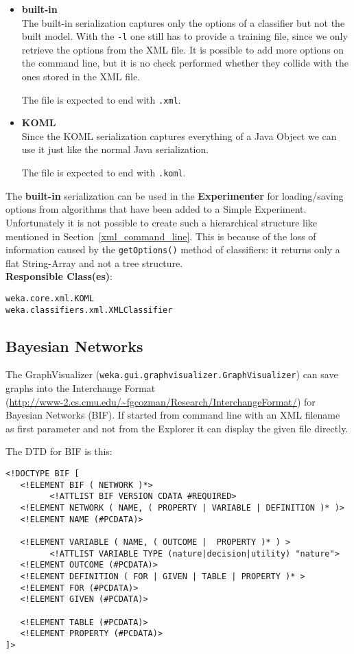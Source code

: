 \begin{itemize}
\item \textbf{built-in}\\
The built-in serialization captures only the options of a classifier
but not the built model. With the \verb=-l= one still has to provide a
training file, since we only retrieve the options from the XML
file. It is possible to add more options on the command line, but it
is no check performed whether they collide with the ones stored in the
XML file.

The file is expected to end with \verb=.xml=.

\item \textbf{KOML}\\
Since the KOML serialization captures everything of a Java Object we
can use it just like the normal Java serialization.

The file is expected to end with \verb=.koml=.
\end{itemize}

\noindent The \textbf{built-in} serialization can be used in the
\textbf{Experimenter} for loading/saving options from algorithms that
have been added to a Simple Experiment. Unfortunately it is not
possible to create such a hierarchical structure like mentioned in
Section~\ref{xml_command_line}. This is because of the loss of
information caused by the \verb=getOptions()= method of classifiers: it
returns only a flat String-Array and not a tree structure.\\

\noindent \textbf{Responsible Class(es)}:

\begin{verbatim}
weka.core.xml.KOML
weka.classifiers.xml.XMLClassifier
\end{verbatim}

\subsection{Bayesian Networks}
The GraphVisualizer (\verb=weka.gui.graphvisualizer.GraphVisualizer=) can
save graphs into the Interchange Format\\
(\url{http://www-2.cs.cmu.edu/~fgcozman/Research/InterchangeFormat/}{}) for
Bayesian Networks (BIF). If started from command line with an XML
filename as first parameter and not from the Explorer it can display
the given file directly.

The DTD for BIF is this:

\begin{verbatim}
<!DOCTYPE BIF [
   <!ELEMENT BIF ( NETWORK )*>
         <!ATTLIST BIF VERSION CDATA #REQUIRED>
   <!ELEMENT NETWORK ( NAME, ( PROPERTY | VARIABLE | DEFINITION )* )>
   <!ELEMENT NAME (#PCDATA)>

   <!ELEMENT VARIABLE ( NAME, ( OUTCOME |  PROPERTY )* ) >
         <!ATTLIST VARIABLE TYPE (nature|decision|utility) "nature">
   <!ELEMENT OUTCOME (#PCDATA)>
   <!ELEMENT DEFINITION ( FOR | GIVEN | TABLE | PROPERTY )* >
   <!ELEMENT FOR (#PCDATA)>
   <!ELEMENT GIVEN (#PCDATA)>

   <!ELEMENT TABLE (#PCDATA)>
   <!ELEMENT PROPERTY (#PCDATA)>
]>
\end{verbatim}

